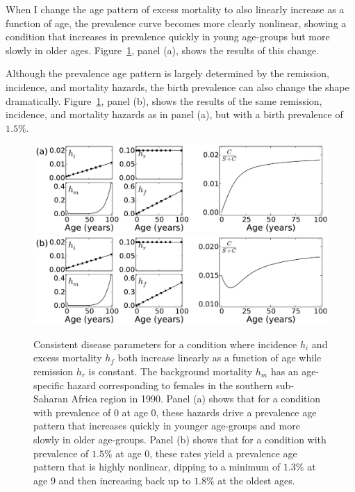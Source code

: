 When I change the age pattern of excess mortality to also linearly
increase as a function of age, the prevalence curve
becomes more clearly nonlinear, showing a condition that increases in
prevalence quickly in young age-groups but more slowly in older
ages. Figure~\ref{forward-sim-ex2}, panel (a), shows the results
of this change.

Although the prevalence age pattern is largely determined by the
remission, incidence, and mortality hazards, the birth prevalence can
also change the shape
dramatically. Figure~\ref{forward-sim-ex2}, panel (b),
shows the results of the same remission, incidence, and mortality
hazards as in panel (a), but with a birth prevalence of $1.5\%$.

\begin{figure}[htb]
\begin{center}
\includegraphics[width=\textwidth]{more-excess-mortality.pdf}
\includegraphics[width=\textwidth]{birth-prevalence.pdf}

\caption{Consistent disease parameters for a condition where incidence
  $h_i$ and excess mortality $h_f$ both increase linearly as a
  function of age while remission $h_r$ is constant. The background
  mortality $h_m$ has an age-specific hazard corresponding to females in
  the southern sub-Saharan Africa region in 1990. Panel (a) shows that for a condition
  with prevalence of $0$ at age $0$, these hazards drive a prevalence
  age pattern that increases quickly in younger age-groups and
  more slowly in older age-groups. Panel (b) shows that for a condition with prevalence of
  $1.5\%$ at age $0$, these rates yield a prevalence age pattern that is
  highly nonlinear, dipping to a minimum of $1.3\%$ at age $9$ and then
  increasing back up to $1.8\%$ at the oldest ages.
}
\label{forward-sim-ex2}
\end{center}
\end{figure}


